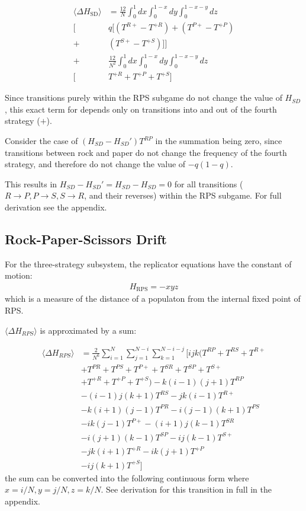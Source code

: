\documentclass[%
 reprint,
 amsmath,amssymb,
 aps,
]{revtex4-2}
\begin{document}
\begin{align}\label{eq:delta_h_sd}
\langle \Delta H_{\mathrm{SD}} \rangle 
&= \frac{12}{N} \int_{0}^{1} dx \int_{0}^{1-x}dy 
\int_{0}^{1-x-y}dz \\ \nonumber
\Big[& q \big[ 
(T^{R+} - T^{+R}) + (T^{P+} - T^{+P}) \\\nonumber
+& (T^{S+} - T^{+S}) \big] \Big] \\\nonumber
+& \frac{12}{N^2} \int_{0}^{1} dx \int_{0}^{1-x}dy 
\int_{0}^{1-x-y} dz \\ \nonumber
\Big[& T^{+R} + T^{+P} + T^{+S} \Big] 
\end{align}


Since transitions purely within the RPS subgame do not change the value
of $H_{SD}$, this exact term for depends only on transitions into and out of 
the fourth strategy ($+$). 

Consider the case of 
$(H_{SD} - H_{SD}')T^{RP}$ in the summation being zero, since transitions between 
rock and paper do not change the frequency of the fourth strategy, and therefore
do not change the value of $-q(1-q)$. 

This results in $H_{SD} - H_{SD}' = H_{SD} - H_{SD} = 0$ for all transitions
($R \rightarrow P, P \rightarrow S, S \rightarrow R$,
and their reverses) within the RPS subgame. For full
derivation see the appendix\cite{project_appendix}.



\subsection{Rock-Paper-Scissors Drift}
For the three-strategy subsystem, the replicator equations have the constant of motion:
\begin{align}
H_{\mathrm{RPS}} = - x y z
\end{align}
which is a measure of the distance of a populaton from the internal fixed point of RPS.



$\langle \Delta H_{RPS} \rangle$ is approximated by a sum:

\begin{align}
  \langle \Delta H_{RPS} \rangle &=
  \frac{2}{N^6} \sum_{i=1}^{N}\sum_{j=1}^{N-i}\sum_{k=1}^{N-i-j}\Big[
  ijk(T^{RP} + T^{RS} + T^{R+} \nonumber \\
  & + T^{PR} + T^{PS} + T^{P+} + T^{SR} + T^{SP} + T^{S+} \nonumber \\
  & + T^{+R} + T^{+P} + T^{+S}) - k(i-1)(j+1)T^{RP} \nonumber \\
  &- (i-1)j(k+1)T^{RS} - jk(i-1)T^{R+} \nonumber\\
  &- k(i+1)(j-1)T^{PR} - i(j-1)(k+1)T^{PS} \nonumber \\
  & - ik(j-1)T^{P+} - (i+1)j(k-1)T^{SR} \nonumber \\
  & - i(j+1)(k-1)T^{SP} - ij(k-1)T^{S+} \nonumber \\
  &- jk(i+1)T^{+R} - ik(j+1)T^{+P} \nonumber \\
  &- ij(k+1)T^{+S}\Big]
\end{align}
the sum can be converted into the following continuous form where
$x = i/N, y= j/N, z=k/N$. See derivation for this transition in full 
in the appendix.
\end{document}
